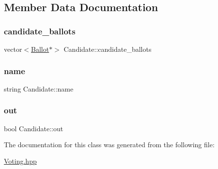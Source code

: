 \subsection{Member Data Documentation}
\mbox{\label{classCandidate_aa2a55fec163365b0430a7e6697b6b18e}} 
\subsubsection{\texorpdfstring{candidate\+\_\+ballots}{candidate\_ballots}}
{\footnotesize\ttfamily vector$<$\hyperlink{classBallot}{Ballot}$\ast$$>$ Candidate\+::candidate\+\_\+ballots}

\mbox{\label{classCandidate_a86d68d981f6e953aa40fddba7c84ccb1}} 
\subsubsection{\texorpdfstring{name}{name}}
{\footnotesize\ttfamily string Candidate\+::name}

\mbox{\label{classCandidate_aa155177c43079bd5601fb3ea6d4ca5c9}} 
\subsubsection{\texorpdfstring{out}{out}}
{\footnotesize\ttfamily bool Candidate\+::out}



The documentation for this class was generated from the following file\+:\begin{DoxyCompactItemize}
\item 
\hyperlink{Voting_8hpp}{Voting.\+hpp}\end{DoxyCompactItemize}
